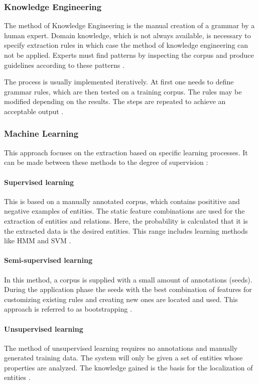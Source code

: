\subsubsection{Knowledge Engineering}
The method of Knowledge Engineering is the manual creation of a grammar by a human expert. Domain knowledge, which is not always available, is necessary to specify extraction rules in which case the method of knowledge engineering can not be applied. Experts must find patterns by inspecting the corpus and produce guidelines according to these patterns \cite{Schramm:2008}\cite{Turmo:2006}.

The process is usually implemented iteratively. At first one needs to define grammar rules, which are then tested on a training corpus. The rules may be modified depending on the results. The steps are repeated to achieve an acceptable output \cite{Appelt:1999}.

\subsubsection{Machine Learning}
This approach focuses on the extraction based on specific learning processes. It can be made between these methods to the degree of supervision \cite{Carstensen:2010}\cite{Schramm:2008}:

\paragraph{Supervised learning}
This is based on a manually annotated corpus, which contains posititive and negative examples of entities. The static feature combinations are used for the extraction of entities and relations. Here, the probability is calculated that it is the extracted data is the desired entities. This range includes learning methods like \gls{HMM} and \gls{SVM} \cite{Schramm:2008}\cite{Siefkes:2005}\cite{Carstensen:2010}.

\paragraph{Semi-supervised learning}
In this method, a corpus is supplied with a small amount of annotations (seeds). During the application phase the seeds with the best combination of features for customizing existing rules and creating new ones are located and used. This approach is referred to as bootstrapping \cite{Carstensen:2010}\cite{Chang:2006}.

\paragraph{Unsupervised learning}
The method of unsupervised learning requires no annotations and manually generated training data. The system will only be given a set of entities whose properties are analyzed. The knowledge gained is the basis for the localization of entities \cite{Carstensen:2010}\cite{Schramm:2008}.

